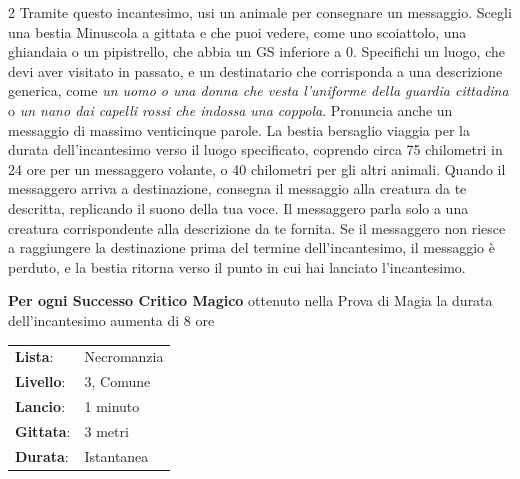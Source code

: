 \begin{multicols}{2}
\label{Animal Messenger}Tramite questo incantesimo, usi un animale per consegnare un messaggio. Scegli una bestia Minuscola a gittata e che puoi vedere, come uno scoiattolo, una ghiandaia o un pipistrello, che abbia un GS inferiore a 0. Specifichi un luogo, che devi aver visitato in passato, e un destinatario che corrisponda a una descrizione generica, come \emph{un uomo o una donna che vesta l'uniforme della guardia cittadina} o \emph{un nano dai capelli rossi che indossa una coppola}. Pronuncia anche un messaggio di massimo venticinque parole. La bestia bersaglio viaggia per la durata dell'incantesimo verso il luogo specificato, coprendo circa 75 chilometri in 24 ore per un messaggero volante, o 40 chilometri per gli altri animali. Quando il messaggero arriva a destinazione, consegna il messaggio alla creatura da te descritta, replicando il suono della tua voce. Il messaggero parla solo a una creatura corrispondente alla descrizione da te fornita. Se il messaggero non riesce a raggiungere la destinazione prima del termine dell'incantesimo, il messaggio è perduto, e la bestia ritorna verso il punto in cui hai lanciato l'incantesimo.

\textbf{Per ogni Successo Critico Magico} ottenuto nella Prova di Magia la durata dell'incantesimo aumenta di 8 ore

\noindent\begin{tabularx}{\linewidth}{p{1.9cm}X}
	\rowcolor{gray!20}\textbf{Lista}: & Necromanzia \\
	\textbf{Livello}: & 3, Comune \\
	\rowcolor{gray!20}\textbf{Lancio}: & 1 minuto \\
	\textbf{Gittata}: & 3 metri \\
	\rowcolor{gray!20}\textbf{Durata}: & Istantanea \\
\end{tabularx}\smallskip


\end{multicols}
